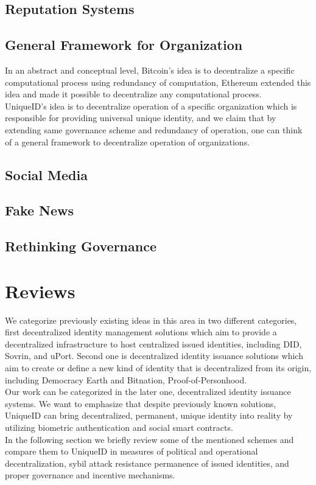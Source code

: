 \documentclass{article}
\begin{document}
\subsection{Reputation Systems}

\subsection{General Framework for Organization}
In an abstract and conceptual level, Bitcoin's idea is to decentralize a specific computational process using redundancy of computation, Ethereum extended this idea and made it possible to decentralize any computational process.\\ UniqueID's idea is to decentralize operation of a specific organization which is responsible for providing universal unique identity, and we claim that by extending same governance scheme and redundancy of operation, one can think of a general framework to decentralize operation of organizations. 
\subsection{Social Media}
\subsection{Fake News}
\subsection{Rethinking Governance}

\section{ Reviews}
We categorize previously existing ideas in this area in two different categories, first decentralized identity management solutions which aim to provide a decentralized infrastructure to host centralized issued identities, including DID, Sovrin, and uPort. Second one is decentralized identity issuance solutions which aim to create or define a new kind of identity that is decentralized from its origin, including Democracy Earth and Bitnation, Proof-of-Personhood.\\
Our work can be categorized in the later one, decentralized identity issuance systems. We want to emphasize that despite previously known solutions, UniqueID can bring decentralized, permanent, unique identity into reality by utilizing biometric authentication and social smart contracts. \\
In the following section we briefly review some of the mentioned schemes and compare them to UniqueID in measures of political and operational decentralization, sybil attack resistance  permanence of issued identities, and proper governance and incentive mechanisms. 
\end{document}
